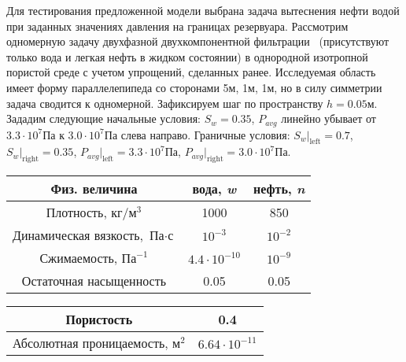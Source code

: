 Для тестирования предложенной модели выбрана задача вытеснения нефти водой при
заданных значениях давления на границах резервуара.
Рассмотрим одномерную задачу двухфазной двухкомпонентной фильтрации ~(присутствуют только вода и легкая нефть в жидком состоянии)
в однородной изотропной пористой среде с учетом упрощений, сделанных ранее.
Исследуемая область имеет форму параллелепипеда со сторонами 5м, 1м, 1м, но в силу симметрии задача сводится к одномерной.
Зафиксируем шаг по пространству $h=0.05\text{м}$.
Зададим следующие начальные условия: $S_w = 0.35$, $P_{avg}$ линейно убывает от $3.3\cdot 10^7$Па к $3.0\cdot 10^7$Па слева направо.
Граничные условия: $S_w|_{\text{left}} = 0.7$, $S_w|_{\text{right}} = 0.35$,
$P_{avg}|_{\text{left}} = 3.3\cdot 10^7$Па, $P_{avg}|_{\text{right}} = 3.0\cdot 10^7$Па.

\begin{table}[h!]
\begin{center}
\begin{tabular}{|c|c|c|}
\hline
Физ. величина & вода, \textit {w} & нефть, \textit {n} \\
\hline
Плотность,  $ {\text{кг}} / {\text{м}^3} $ & 1000 & 850 \\
\hline
Динамическая вязкость, $ \text{Па} \cdot \text{с} $ & $10^{-3}$ & $10^{-2}$ \\
\hline
Сжимаемость, $ \text{Па}^{-1}$ & $4.4 \cdot 10^{-10}$ & $10^{-9}$ \\
\hline
Остаточная насыщенность & 0.05 & 0.05 \\
\hline
\end{tabular}
\label{tabular:liquids}
\end{center}
\end{table}

\begin{table}[h!]
\begin{center}
\begin{tabular}{|c|c|}
\hline
Пористость & 0.4\\
\hline
Абсолютная проницаемость, $ \text{м}^{2}$ & $6.64 \cdot 10^{-11}$ \\
\hline
\end{tabular}
\label{tabular:medium}
\end{center}
\end{table}

